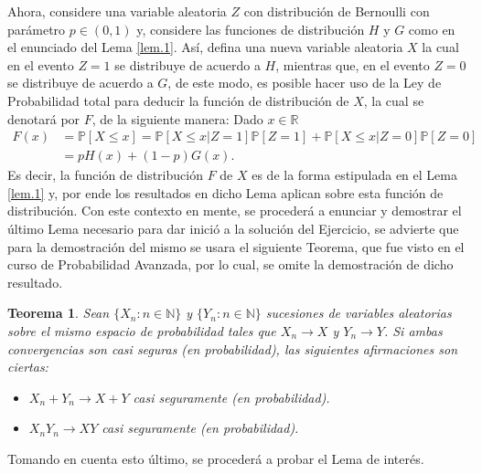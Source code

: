 \documentclass[10.5pt,notitlepage]{article}
\newcommand{\PP}{\mathbb{P}}
\newcommand{\RR}{\mathbb{R}}
\newcommand{\NN}{\mathbb{N}}
\theoremstyle{plain}
\newtheorem{thm}{Teorema}[section] %
\begin{document}
Ahora, considere una variable aleatoria \(Z\) con distribución de Bernoulli con parámetro \(p \in (0,1)\) y, considere las funciones de distribución \(H\) y \(G\) como en el enunciado del Lema \ref{lem.1}. Así, defina una nueva variable aleatoria \(X\) la cual en el evento \(Z = 1\) se distribuye de acuerdo a \(H\), mientras que, en el evento \(Z = 0\) se distribuye de acuerdo a \(G\), de este modo, es posible hacer uso de la Ley de Probabilidad total para deducir la función de distribución de \(X\), la cual se denotará por \(F\), de la siguiente manera: Dado \(x \in \RR\)
\begin{align}\label{lab.3}
    F(x) &= \PP[X \leq x] = \PP[X \leq x| Z = 1]\PP[Z = 1] + \PP[X \leq x | Z = 0]\PP[Z = 0]\nonumber\\ 
         &= pH(x) + (1 - p)G(x).
\end{align}
Es decir, la función de distribución \(F\) de \(X\) es de la forma estipulada en el Lema \ref{lem.1} y, por ende los resultados en dicho Lema aplican sobre esta función de distribución. Con este contexto en mente, se procederá a enunciar y demostrar el último Lema necesario para dar inició a la solución del Ejercicio, se advierte que para la demostración del mismo se usara el siguiente Teorema, que fue visto en el curso de Probabilidad Avanzada, por lo cual, se omite la demostración de dicho resultado.
\begin{thm} \label{T1.2}
Sean \(\{X_n : n\in \NN\}\) y \(\{Y_n: n \in \NN\}\) sucesiones de variables aleatorias sobre el mismo espacio de probabilidad tales que \(X_n\to X\) y \(Y_n\to Y\). Si ambas convergencias son casi seguras (en probabilidad), las siguientes afirmaciones son ciertas:
\begin{itemize}
     \item \(X_n+Y_n\to X+Y\)  casi seguramente (en probabilidad).
    \item \(X_nY_n\to XY\)  casi seguramente (en probabilidad).
\end{itemize}
\end{thm}
Tomando en cuenta esto último, se procederá a probar el Lema de interés.
\end{document}
